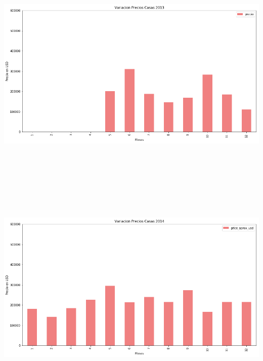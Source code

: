 \documentclass[a4paper, 10pt]{article}
\begin{document}
        \begin{center}
              \includegraphics[width=6in, height=4.2in]{images/vCasas2013}
        \end{center}
        \begin{center}
              \includegraphics[width=6in, height=4.2in]{images/vCasas2014}
        \end{center}
\end{document}
